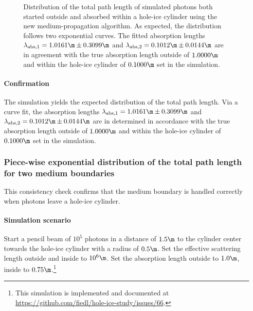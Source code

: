 
\begin{figure}
  \caption{Distribution of the total path length of simulated photons both started outside and absorbed within a hole-ice cylinder using the new medium-propagation algorithm. As expected, the distribution follows two exponential curves. The fitted absorption lengths $\lambda_\text{abs,1} = 1.0161\m \pm 0.3099\m$ and $\lambda_\text{abs,2} = 0.1012\m \pm 0.0144\m$ are in agreement with the true absorption length outside of $1.0000\m$ and within the hole-ice cylinder of $0.1000\m$ set in the simulation.}
\end{figure}


\paragraph{Confirmation} The simulation yields the expected distribution of the total path length. Via a curve fit, the absorption lengths $\lambda_\text{abs,1} = 1.0161\m \pm 0.3099\m$ and $\lambda_\text{abs,2} = 0.1012\m \pm 0.0144\m$ are in determined in accordance with the true absorption length outside of $1.0000\m$ and within the hole-ice cylinder of $0.1000\m$ set in the simulation.


\subsubsection{Piece-wise exponential distribution of the total path length for two medium boundaries}


This consistency check confirms that the medium boundary is handled correctly when photons leave a hole-ice cylinder.

\paragraph{Simulation scenario} Start a pencil beam of $10^5$ photons in a distance of $1.5\m$ to the cylinder center towards the hole-ice cylinder with a radius of $0.5\m$. Set the effective scattering length outside and inside to $10^6\m$. Set the absorption length outside to $1.0\m$, inside to $0.75\m$.\footnote{This simulation is implemented and documented at \url{https://github.com/fiedl/hole-ice-study/issues/66}.}

